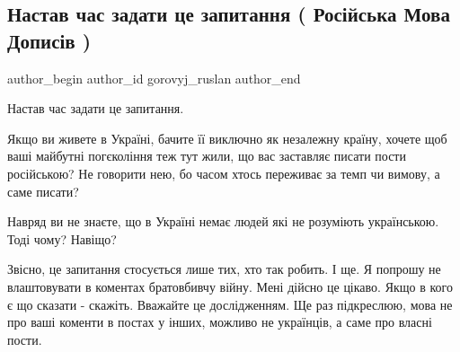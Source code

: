  
 
 
 
 
 
\subsection{Настав час задати це запитання ( Російська Мова Дописів )}
\label{sec:04_10_2021.fb.gorovyj_ruslan.1.jazyk_posty_facebook}
 
\ifcmt
 author_begin
   author_id gorovyj_ruslan
 author_end
\fi

Настав час задати це запитання.

Якщо ви живете в Україні, бачите її виключно як незалежну країну, хочете щоб
ваші майбутні погєкоління теж тут жили, що вас заставляє писати пости
російською? Не говорити нею, бо часом хтось переживає за темп чи вимову, а саме
писати? 

Навряд ви не знаєте, що в Україні немає людей які не розуміють українською.
Тоді чому? Навіщо? 

Звісно, це запитання стосується лише тих, хто так робить. І ще. Я попрошу не
влаштовувати в коментах братовбивчу війну. Мені дійсно це цікаво. Якщо в кого є
що сказати - скажіть. Вважайте це дослідженням. Ще раз підкреслюю, мова не про
ваші коменти в постах у інших, можливо не українців, а саме про власні пости.



